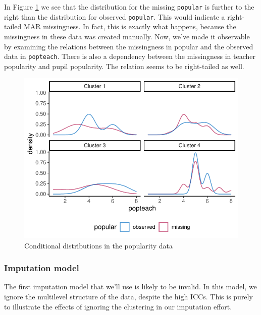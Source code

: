\documentclass[
]{jss}
\begin{document}
In Figure \ref{fig:pop_dist} we see that the distribution for the
missing \texttt{popular} is further to the right than the distribution
for observed \texttt{popular}. This would indicate a right-tailed MAR
missingness. In fact, this is exactly what happens, because the
missingness in these data was created manually. Now, we've made it
observable by examining the relations between the missingness in popular
and the observed data in \texttt{popteach}. There is also a dependency
between the missingness in teacher popularity and pupil popularity. The
relation seems to be right-tailed as well.

\begin{CodeChunk}
\begin{figure}

{\centering \includegraphics{Manuscript_files/figure-latex/pop_dist-1} 

}

\caption[Conditional distributions in the popularity data]{Conditional distributions in the popularity data}\label{fig:pop_dist}
\end{figure}
\end{CodeChunk}

\hypertarget{imputation-model}{%
\subsubsection{Imputation model}\label{imputation-model}}

The first imputation model that we'll use is likely to be invalid. In
this model, we ignore the multilevel structure of the data, despite the
high ICCs. This is purely to illustrate the effects of ignoring the
clustering in our imputation effort.
\end{document}
